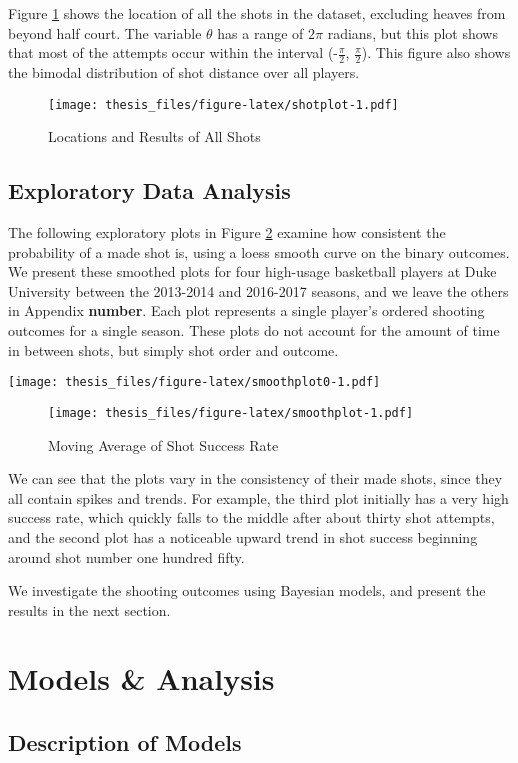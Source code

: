\documentclass[12pt,twoside]{dukestatscithesis}
\theoremstyle{definition}
\theoremstyle{definition}
\theoremstyle{definition}
\theoremstyle{remark}
\begin{document}
Figure \ref{fig:shotplot} shows the location of all the shots in the
dataset, excluding heaves from beyond half court. The variable
\(\theta\) has a range of \(2\pi\) radians, but this plot shows that
most of the attempts occur within the interval (-\(\frac{\pi}{2}\),
\(\frac{\pi}{2}\)). This figure also shows the bimodal distribution of
shot distance over all players.
\begin{figure}[htbp]
\centering
\texttt{[image: thesis\_files/figure-latex/shotplot-1.pdf]}
\caption{\label{fig:shotplot}Locations and Results of All Shots}
\end{figure}
\section{Exploratory Data Analysis}\label{exploratory-data-analysis}

The following exploratory plots in Figure \ref{fig:smoothplot} examine
how consistent the probability of a made shot is, using a loess smooth
curve on the binary outcomes. We present these smoothed plots for four
high-usage basketball players at Duke University between the 2013-2014
and 2016-2017 seasons, and we leave the others in Appendix
\textbf{number}. Each plot represents a single player's ordered shooting
outcomes for a single season. These plots do not account for the amount
of time in between shots, but simply shot order and outcome.

\texttt{[image: thesis\_files/figure-latex/smoothplot0-1.pdf]}
\begin{figure}[htbp]
\centering
\texttt{[image: thesis\_files/figure-latex/smoothplot-1.pdf]}
\caption{\label{fig:smoothplot}Moving Average of Shot Success Rate}
\end{figure}
We can see that the plots vary in the consistency of their made shots,
since they all contain spikes and trends. For example, the third plot
initially has a very high success rate, which quickly falls to the
middle after about thirty shot attempts, and the second plot has a
noticeable upward trend in shot success beginning around shot number one
hundred fifty.

We investigate the shooting outcomes using Bayesian models, and present
the results in the next section.

\chapter{Models \& Analysis}\label{models}

\section{Description of Models}\label{description-of-models}
\end{document}
